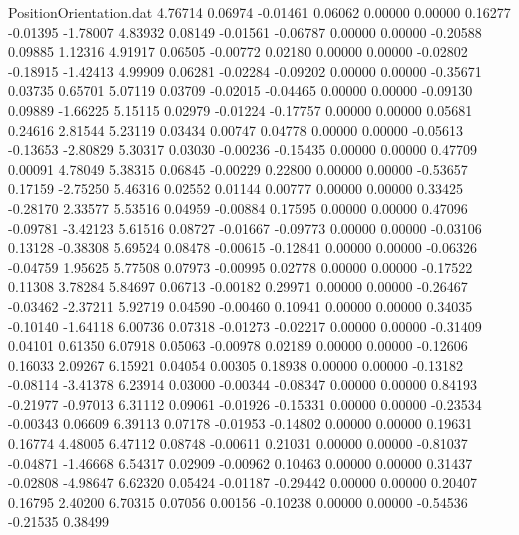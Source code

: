 \begin{filecontents}{PositionOrientation.dat}
   4.76714    0.06974   -0.01461     0.06062    0.00000    0.00000    0.16277   -0.01395   -1.78007
   4.83932    0.08149   -0.01561    -0.06787    0.00000    0.00000   -0.20588    0.09885    1.12316
   4.91917    0.06505   -0.00772     0.02180    0.00000    0.00000   -0.02802   -0.18915   -1.42413
   4.99909    0.06281   -0.02284    -0.09202    0.00000    0.00000   -0.35671    0.03735    0.65701
   5.07119    0.03709   -0.02015    -0.04465    0.00000    0.00000   -0.09130    0.09889   -1.66225
   5.15115    0.02979   -0.01224    -0.17757    0.00000    0.00000    0.05681    0.24616    2.81544
   5.23119    0.03434    0.00747     0.04778    0.00000    0.00000   -0.05613   -0.13653   -2.80829
   5.30317    0.03030   -0.00236    -0.15435    0.00000    0.00000    0.47709    0.00091    4.78049
   5.38315    0.06845   -0.00229     0.22800    0.00000    0.00000   -0.53657    0.17159   -2.75250
   5.46316    0.02552    0.01144     0.00777    0.00000    0.00000    0.33425   -0.28170    2.33577
   5.53516    0.04959   -0.00884     0.17595    0.00000    0.00000    0.47096   -0.09781   -3.42123
   5.61516    0.08727   -0.01667    -0.09773    0.00000    0.00000   -0.03106    0.13128   -0.38308
   5.69524    0.08478   -0.00615    -0.12841    0.00000    0.00000   -0.06326   -0.04759    1.95625
   5.77508    0.07973   -0.00995     0.02778    0.00000    0.00000   -0.17522    0.11308    3.78284
   5.84697    0.06713   -0.00182     0.29971    0.00000    0.00000   -0.26467   -0.03462   -2.37211
   5.92719    0.04590   -0.00460     0.10941    0.00000    0.00000    0.34035   -0.10140   -1.64118
   6.00736    0.07318   -0.01273    -0.02217    0.00000    0.00000   -0.31409    0.04101    0.61350
   6.07918    0.05063   -0.00978     0.02189    0.00000    0.00000   -0.12606    0.16033    2.09267
   6.15921    0.04054    0.00305     0.18938    0.00000    0.00000   -0.13182   -0.08114   -3.41378
   6.23914    0.03000   -0.00344    -0.08347    0.00000    0.00000    0.84193   -0.21977   -0.97013
   6.31112    0.09061   -0.01926    -0.15331    0.00000    0.00000   -0.23534   -0.00343    0.06609
   6.39113    0.07178   -0.01953    -0.14802    0.00000    0.00000    0.19631    0.16774    4.48005
   6.47112    0.08748   -0.00611     0.21031    0.00000    0.00000   -0.81037   -0.04871   -1.46668
   6.54317    0.02909   -0.00962     0.10463    0.00000    0.00000    0.31437   -0.02808   -4.98647
   6.62320    0.05424   -0.01187    -0.29442    0.00000    0.00000    0.20407    0.16795    2.40200
   6.70315    0.07056    0.00156    -0.10238    0.00000    0.00000   -0.54536   -0.21535    0.38499

\end{filecontents}
